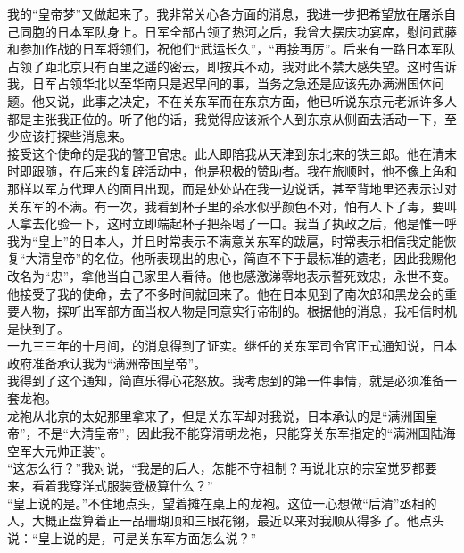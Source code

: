 我的“皇帝梦”又做起来了。我非常关心各方面的消息，我进一步把希望放在屠杀自己同胞的日本军队身上。日军全部占领了热河之后，我曾大摆庆功宴席，慰问武藤和参加作战的日军将领们，祝他们“武运长久”，“再接再厉”。后来有一路日本军队占领了距北京只有百里之遥的密云，即按兵不动，我对此不禁大感失望。这时告诉我，日军占领华北以至华南只是迟早间的事，当务之急还是应该先办满洲国体问题。他又说，此事之决定，不在关东军而在东京方面，他已听说东京元老派许多人都是主张我正位的。听了他的话，我觉得应该派个人到东京从侧面去活动一下，至少应该打探些消息来。\\

接受这个使命的是我的警卫官忠。此人即陪我从天津到东北来的铁三郎。他在清末时即跟随，在后来的复辟活动中，他是积极的赞助者。我在旅顺时，他不像上角和那样以军方代理人的面目出现，而是处处站在我一边说话，甚至背地里还表示过对关东军的不满。有一次，我看到杯子里的茶水似乎颜色不对，怕有人下了毒，要叫人拿去化验一下，这时立即端起杯子把茶喝了一口。我当了执政之后，他是惟一呼我为“皇上”的日本人，并且时常表示不满意关东军的跋扈，时常表示相信我定能恢复“大清皇帝”的名位。他所表现出的忠心，简直不下于最标准的遗老，因此我赐他改名为“忠”，拿他当自己家里人看待。他也感激涕零地表示誓死效忠，永世不变。他接受了我的使命，去了不多时间就回来了。他在日本见到了南次郎和黑龙会的重要人物，探听出军部方面当权人物是同意实行帝制的。根据他的消息，我相信时机是快到了。\\

一九三三年的十月间，的消息得到了证实。继任的关东军司令官正式通知说，日本政府准备承认我为“满洲帝国皇帝”。\\

我得到了这个通知，简直乐得心花怒放。我考虑到的第一件事情，就是必须准备一套龙袍。\\

龙袍从北京的太妃那里拿来了，但是关东军却对我说，日本承认的是“满洲国皇帝”，不是“大清皇帝”，因此我不能穿清朝龙袍，只能穿关东军指定的“满洲国陆海空军大元帅正装”。\\

“这怎么行？”我对说，“我是的后人，怎能不守祖制？再说北京的宗室觉罗都要来，看着我穿洋式服装登极算什么？”\\

“皇上说的是。”不住地点头，望着摊在桌上的龙袍。这位一心想做“后清”丞相的人，大概正盘算着正一品珊瑚顶和三眼花翎，最近以来对我顺从得多了。他点头说：“皇上说的是，可是关东军方面怎么说？”\\

